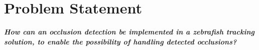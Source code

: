 \chapter{Problem Statement}
\textbf{\textit{How can an occlusion detection be implemented in a zebrafish tracking solution, to enable the possibility of handling detected occlusions?}}